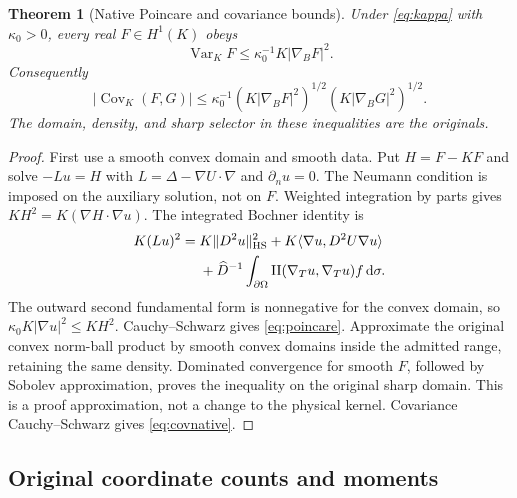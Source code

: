 \documentclass[11pt,letterpaper]{article}
\numberwithin{equation}{section}
\theoremstyle{plain}
\newtheorem{theorem}{Theorem}[section]
\theoremstyle{remark}
\DeclareMathOperator{\Var}{Var}
\DeclareMathOperator{\Cov}{Cov}
\newcommand{\dd}{\,\mathrm d}
\newcommand{\Dhat}{\widehat D}
\begin{document}
\begin{theorem}[Native Poincare and covariance bounds]
\label{thm:poincare}
Under \eqref{eq:kappa} with $\kappa_0>0$, every real $F\in H^1(K)$ obeys
\begin{equation}
 \Var_KF\le\kappa_0^{-1}K|\nabla_BF|^2.
 \label{eq:poincare}
\end{equation}
Consequently
\begin{equation}
 |\Cov_K(F,G)|\le\kappa_0^{-1}
 (K|\nabla_BF|^2)^{1/2}(K|\nabla_BG|^2)^{1/2}.
 \label{eq:covnative}
\end{equation}
The domain, density, and sharp selector in these inequalities are the originals.
\end{theorem}
\begin{proof}
First use a smooth convex domain and smooth data. Put $H=F-KF$ and solve
$-Lu=H$ with $L=\Delta-\nabla U\cdot\nabla$ and $\partial_nu=0$.
The Neumann condition is imposed on the auxiliary solution, not on $F$.
Weighted integration by parts gives $KH^2=K(\nabla H\cdot\nabla u)$.
The integrated Bochner identity is
\begin{align*}
 K(Lu)^2={}&K\|D^2u\|_{\rm HS}^2
    +K\langle\nabla u,D^2U\nabla u\rangle\\
 &+\Dhat^{-1}\int_{\partial\Omega}
       \mathrm{II}(\nabla_Tu,\nabla_Tu)f\dd\sigma.
\end{align*}
The outward second fundamental form is nonnegative for the convex domain, so
$\kappa_0K|\nabla u|^2\le KH^2$. Cauchy--Schwarz gives
\eqref{eq:poincare}. Approximate the original convex norm-ball product by smooth
convex domains inside the admitted range, retaining the same density. Dominated
convergence for smooth $F$, followed by Sobolev approximation, proves the
inequality on the original sharp domain. This is a proof approximation, not a
change to the physical kernel. Covariance Cauchy--Schwarz gives
\eqref{eq:covnative}.
\end{proof}

\subsection{Original coordinate counts and moments}
\end{document}
